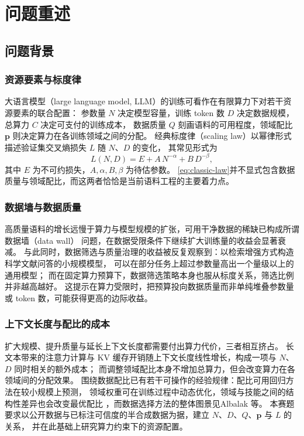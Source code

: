 \section{问题重述}
\label{sec:problem}

\subsection{问题背景}
\subsubsection{资源要素与标度律}
大语言模型（large language model, LLM）的训练可看作在有限算力下对若干资源要素的联合配置：
参数量 $N$ 决定模型容量，训练 token 数 $D$ 决定数据规模，总算力 $C$ 决定可支付的训练成本，
数据质量 $Q$ 刻画语料的可用程度，领域配比 $\boldsymbol{p}$ 则决定算力在各训练领域之间的分配。
经典标度律（scaling law）以幂律形式描述验证集交叉熵损失 $L$ 随 $N$、$D$ 的变化，
其常见形式为
\begin{equation}
  L(N,D)=E+A\,N^{-\alpha}+B\,D^{-\beta},
  \label{eq:classic-law}
\end{equation}
其中 $E$ 为不可约损失，$A,\alpha,B,\beta$ 为待估参数\citep{kaplan2020,hoffmann2022}。
\eqref{eq:classic-law}并不显式包含数据质量与领域配比，而这两者恰恰是当前语料工程的主要着力点。

\subsubsection{数据墙与数据质量}
高质量语料的增长远慢于算力与模型规模的扩张，可用干净数据的稀缺已构成所谓数据墙（data wall）
问题，在数据受限条件下继续扩大训练量的收益会显著衰减\citep{muennighoff2023}。
与此同时，数据筛选与质量治理的收益被反复观察到：以检索增强方式构造科学文献问答的小规模模型，
可以在部分任务上超过参数量高出一个量级以上的通用模型\citep{asai2026openscholar}；
而在固定算力预算下，数据筛选策略本身也服从标度关系，筛选比例并非越高越好\citep{goyal2024filtering}。
这提示在算力受限时，把预算投向数据质量而非单纯堆叠参数量或 token 数，可能获得更高的边际收益。

\subsubsection{上下文长度与配比的成本}
扩大规模、提升质量与延长上下文长度都需要付出算力代价，三者相互挤占。
长文本带来的注意力计算与 KV 缓存开销随上下文长度线性增长，构成一项与 $N$、$D$ 同时相关的额外成本；
而调整领域配比本身不增加总算力，但会改变算力在各领域间的分配效果。
围绕数据配比已有若干可操作的经验规律：配比可用回归方法在较小规模上预测\citep{liu2024regmix}，
领域权重可在训练过程中动态优化\citep{xie2023doremi}，领域与技能之间的结构性差异也会改变最优配比
\citep{chen2023skillit}，而数据选择方法的整体图景见Albalak 等\citep{albalak2024survey}。
本赛题要求以公开数据与已标注可信度的半合成数据为据，建立 $N$、$D$、$Q$、$\boldsymbol{p}$ 与 $L$ 的关系，
并在此基础上研究算力约束下的资源配置。

